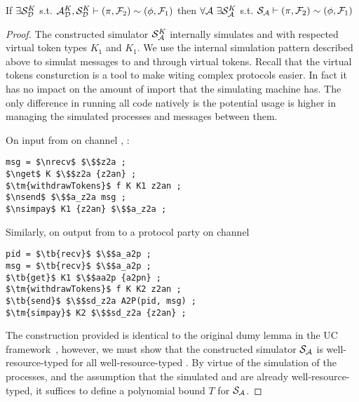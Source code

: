 \begin{theorem}\label{thm:dummy}
If $\exists \mathcal{S}_{\mathcal{D}}^{K}$ s.t. $ \mathcal{A}_\mathcal{D}^K, \mathcal{S}_{\mathcal{D}}^K \vdash (\pi, \mathcal{F}_2) \sim (\phi, \mathcal{F}_1)$ then $\forall \mathcal{A} \ \exists \mathcal{S}_\mathcal{A}^K$ s.t. $\mathcal{S}_{\mathcal{A}} \vdash  (\pi, \mathcal{F}_2) \sim (\phi, \mathcal{F}_1)$ 
\end{theorem}

\begin{proof}
The constructed simulator $\mathcal{S}_\mathcal{A}^K$ internally simulates \Dummysim and \Adversary with respected virtual token types $K_1$ and $K_1$. 
We use the internal simulation pattern described above to simulat messages to \Dummysim and \Adversary through virtual tokens.
Recall that the virtual tokens consturction is a tool to make witing complex protocols easier.
In fact it has no impact on the amount of import that the simulating machine has.
The only difference in running all code natively is the potential usage is higher in managing the simulated processes and messages between them.

On input from \Environment on channel , \Simulator:
\begin{lstlisting}[basicstyle=\small\BeraMonottFamily, frame=single,  mathescape]
msg = $\nrecv$ $\$$z2a ;
$\nget$ K $\$$z2a {z2an} ;
$\tm{withdrawTokens}$ f K K1 z2an ;
$\nsend$ $\$$a_z2a msg ;
$\nsimpay$ K1 {z2an} $\$$a_z2a ; 
\end{lstlisting}

Similarly, on output from \Adversary to a protocol party on channel 
\begin{lstlisting}[basicstyle=\small\BeraMonottFamily, frame=single,  mathescape]
pid = $\tb{recv}$ $\$$a_a2p ;
msg = $\tb{recv}$ $\$$a_a2p ;
$\tb{get}$ K1 $\$$aa2p {a2pn} ;
$\tm{withdrawTokens}$ f K K2 z2an ;
$\tb{send}$ $\$$sd_z2a A2P(pid, msg) ;
$\tm{simpay}$ K2 $\$$sd_z2a {z2an} ;
\end{lstlisting}

The construction provided is identical to the original dumy lemma in the UC framework~\cite{uc}, however, we must show that the constructed simulator $\mathcal{S}_\mathcal{A}$ is well-resource-typed for all well-resource-typed \Adversary.
By virtue of the simulation of the processes, and the assumption that the simulated \Adversary and \Dummysim are already well-resource-typed, it suffices to define a polynomial bound $T$ for $\mathcal{S}_\mathcal{A}$.


\end{proof}
